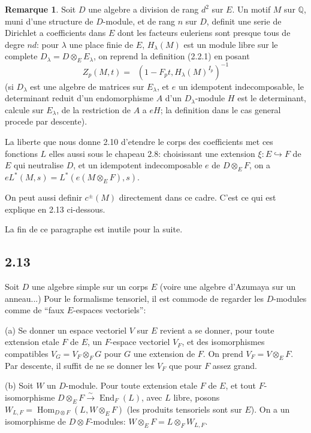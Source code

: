 \documentclass[12pt,a4paper]{article}
\theoremstyle{plain}
\theoremstyle{definition}
\newtheorem{remark}[definition]{Remarque}
\theoremstyle{remark}
\DeclareMathOperator{\Hom}{Hom}
\DeclareMathOperator{\End}{End}
\DeclareMathOperator{\detred}{det^{red}}
\newcommand{\Q}{\mathbb{Q}}
\begin{document}
\begin{remark}
Soit $D$ une algebre a division de rang $d^2$ sur $E$. Un motif $M$ sur $\Q$, muni d'une
structure de $D$-module, et de rang $n$ sur $D$, definit une serie de Dirichlet a coefficients
dans $E$ dont les facteurs euleriens sont presque tous de degre $nd$: pour $\lambda$ une place
finie de $E$, $H_\lambda(M)$ est un module libre sur le complete $D_\lambda = D \otimes_E E_\lambda$,
on reprend la definition (2.2.1) en posant
\[
Z_p(M, t) = \detred(1 - F_p t, H_\lambda(M)^{I_p})^{-1}
\]
(si $D_\lambda$ est une algebre de matrices sur $E_\lambda$, et $e$ un idempotent indecomposable, le
determinant reduit d'un endomorphisme $A$ d'un $D_\lambda$-module $H$ est le determinant,
calcule sur $E_\lambda$, de la restriction de $A$ a $eH$; la definition dans le cas general procede
par descente).

La liberte que nous donne 2.10 d'etendre le corps des coefficients met ces fonctions $L$
elles aussi sous le chapeau 2.8: choisissant une extension $\xi: E \hookrightarrow F$ de $E$
qui neutralise $D$, et un idempotent indecomposable $e$ de $D \otimes_E F$, on a
$e L^*(M, s) = L^*(e(M \otimes_E F), s)$.

On peut aussi definir $c^\pm(M)$ directement dans ce cadre. C'est ce qui est explique
en 2.13 ci-dessous.
\end{remark}

La fin de ce paragraphe est inutile pour la suite.

\subsection*{2.13}

Soit $D$ une algebre simple sur un corps $E$ (voire une algebre d'Azumaya sur un
anneau...) Pour le formalisme tensoriel, il est commode de regarder les $D$-modules
comme de ``faux $E$-espaces vectoriels'':

(a) Se donner un espace vectoriel $V$ sur $E$ revient a se donner, pour toute extension
etale $F$ de $E$, un $F$-espace vectoriel $V_F$, et des isomorphismes compatibles
$V_G = V_F \otimes_F G$ pour $G$ une extension de $F$. On prend $V_F = V \otimes_E F$. Par descente,
il suffit de ne se donner les $V_F$ que pour $F$ assez grand.

(b) Soit $W$ un $D$-module. Pour toute extension etale $F$ de $E$, et tout
$F$-isomorphisme $D \otimes_E F \xrightarrow{\sim} \End_F(L)$, avec $L$ libre, posons
$W_{L,F} = \Hom_{D \otimes F}(L, W \otimes_E F)$ (les produits tensoriels sont sur $E$). On a un
isomorphisme de $D \otimes F$-modules: $W \otimes_E F = L \otimes_F W_{L,F}$.
\end{document}
